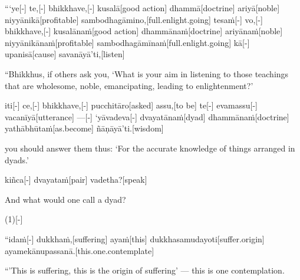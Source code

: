 \begin{samepage}
\begingl[glneveryline={\PaliGlossA,\PaliGlossB}]
“‘ye[-] te,[-] bhikkhave,[-] kusalā[good action] dhammā[doctrine] ariyā[noble] niyyānikā[profitable] sambodhagāmino,[full.enlight.going] tesaṁ[-] vo,[-] bhikkhave,[-] kusalānaṁ[good action] dhammānaṁ[doctrine] ariyānaṁ[noble] niyyānikānaṁ[profitable] sambodhagāmīnaṁ[full.enlight.going] kā[-] upanisā[cause] savanāyā’ti,[listen]
\endgl
\nopagebreak
\linespread{0.5}
\begin{spacin}{0.2}
{\PaliGlossFT “Bhikkhus, if others ask you, ‘What is your aim in listening to those teachings that are wholesome, noble, emancipating, leading to enlightenment?’}
\end{spacin}
\vskip 12pt
\end{samepage}
\begin{samepage}
\begingl[glneveryline={\PaliGlossA,\PaliGlossB}]
iti[-] ce,[-] bhikkhave,[-] pucchitāro[asked] assu,[to be] te[-] evamassu[-] vacanīyā[utterance] —[-] ‘yāvadeva[-] dvayatānaṁ[dyad] dhammānaṁ[doctrine] yathābhūtaṁ[as.become] ñāṇāyā’ti.[wisdom]
\endgl
\nopagebreak
\linespread{0.5}
\begin{spacin}{0.2}
{\PaliGlossFT you should answer them thus: ‘For the accurate knowledge of things arranged in dyads.’}
\end{spacin}
\vskip 12pt
\end{samepage}
\begin{samepage}
\begingl[glneveryline={\PaliGlossA,\PaliGlossB}]
kiñca[-] dvayataṁ[pair] vadetha?[speak]
\endgl
\nopagebreak
\linespread{0.5}
\begin{spacin}{0.2}
{\PaliGlossFT And what would one call a dyad?}
\end{spacin}
\vskip 12pt
\end{samepage}
\vskip 0.2in
\begin{samepage}
\begingl[glneveryline={\PaliGlossA,\PaliGlossB}]
(1)[-]
\endgl
\nopagebreak
\linespread{0.5}
\begin{spacin}{0.2}
{}
\end{spacin}
\vskip 12pt
\end{samepage}
\begin{samepage}
\begingl[glneveryline={\PaliGlossA,\PaliGlossB}]
“idaṁ[-] dukkhaṁ,[suffering] ayaṁ[this] dukkhasamudayoti[suffer.origin] ayamekānupassanā.[this.one.contemplate]
\endgl
\nopagebreak
\linespread{0.5}
\begin{spacin}{0.2}
{\PaliGlossFT “’This is suffering, this is the origin of suffering’ — this is one contemplation.}
\end{spacin}
\vskip 12pt
\end{samepage}
